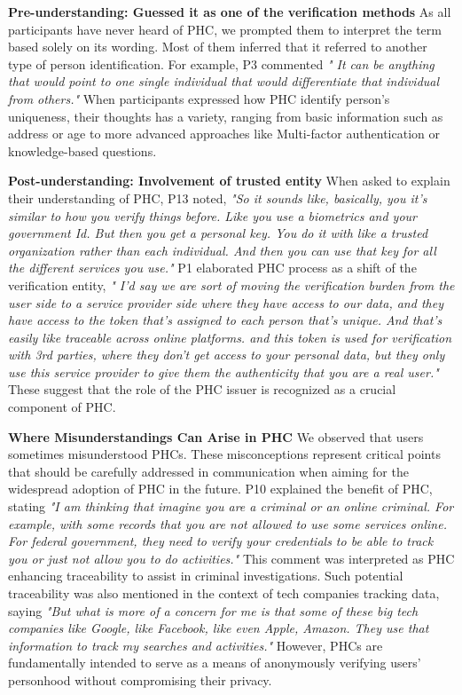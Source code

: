 \textbf{Pre-understanding: Guessed it as one of the verification methods} As all participants have never heard of PHC, we prompted them to interpret the term based solely on its wording. Most of them inferred that it referred to another type of person identification. For example, P3 commented \textit{" It can be anything that would point to one single individual that would differentiate that individual from others."} When participants expressed how PHC identify person's uniqueness, their thoughts has a variety, ranging from basic information such as address or age to more advanced approaches like Multi-factor authentication or knowledge-based questions.

\textbf{Post-understanding: Involvement of trusted entity} When asked to explain their understanding of PHC, P13 noted, \textit{"So it sounds like, basically, you it's similar to how you verify things before. Like you use a biometrics and your government Id. But then you get a personal key. You do it with like a trusted organization rather than each individual. And then you can use that key for all the different services you use."} P1 elaborated PHC process as a shift of the verification entity, \textit{" I'd say we are sort of moving the verification burden from the user side to a service provider side where they have access to our data, and they have access to the token that's assigned to each person that's unique. And that's easily like traceable across online platforms. and this token is used for verification with 3rd parties, where they don't get access to your personal data, but they only use this service provider to give them the authenticity that you are a real user."} These suggest that the role of the PHC issuer is recognized as a crucial component of PHC.

\textbf{Where Misunderstandings Can Arise in PHC}
We observed that users sometimes misunderstood PHCs. These misconceptions represent critical points that should be carefully addressed in communication when aiming for the widespread adoption of PHC in the future. P10 explained the benefit of PHC, stating \textit{"I am thinking that imagine you are a criminal or an online criminal. For example, with some records that you are not allowed to use some services online. For federal government, they need to verify your credentials to be able to track you or just not allow you to do activities."} This comment was interpreted as PHC enhancing traceability to assist in criminal investigations. Such potential traceability was also mentioned in the context of tech companies tracking data, saying \textit{"But what is more of a concern for me is that some of these big tech companies like Google, like Facebook, like even Apple, Amazon. They use that information to track my searches and activities."} However, PHCs are fundamentally intended to serve as a means of anonymously verifying users' personhood without compromising their privacy. 


